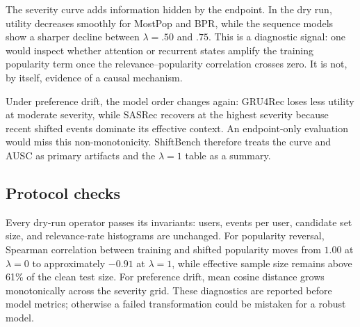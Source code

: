 The severity curve adds information hidden by the endpoint.  In the dry run,
utility decreases smoothly for MostPop and BPR, while the sequence models show a
sharper decline between $\lambda=.50$ and $.75$.  This is a diagnostic signal:
one would inspect whether attention or recurrent states amplify the training
popularity term once the relevance--popularity correlation crosses zero.  It is
not, by itself, evidence of a causal mechanism.

Under preference drift, the model order changes again: GRU4Rec loses less
utility at moderate severity, while SASRec recovers at the highest severity
because recent shifted events dominate its effective context.  An endpoint-only
evaluation would miss this non-monotonicity.  ShiftBench therefore treats the
curve and AUSC as primary artifacts and the $\lambda=1$ table as a summary.

\subsection{Protocol checks}

Every dry-run operator passes its invariants: users, events per user, candidate
set size, and relevance-rate histograms are unchanged.  For popularity reversal,
Spearman correlation between training and shifted popularity moves from $1.00$
at $\lambda=0$ to approximately $-0.91$ at $\lambda=1$, while effective sample
size remains above 61\% of the clean test size.  For preference drift, mean cosine
distance grows monotonically across the severity grid.  These diagnostics are
reported before model metrics; otherwise a failed transformation could be
mistaken for a robust model.
